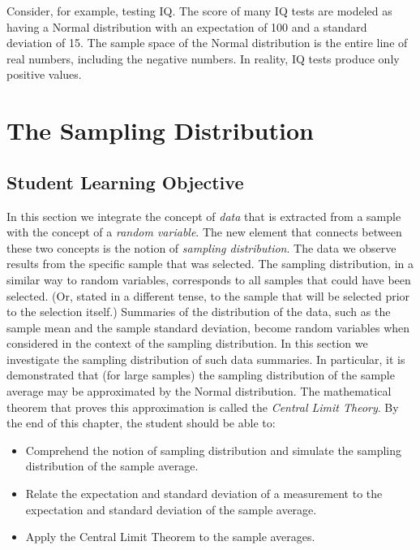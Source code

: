 \documentclass[]{krantz}
\theoremstyle{definition}
\theoremstyle{definition}
\theoremstyle{definition}
\theoremstyle{remark}
\begin{document}
Consider, for example, testing IQ. The score of many IQ tests are
modeled as having a Normal distribution with an expectation of 100 and a
standard deviation of 15. The sample space of the Normal distribution is
the entire line of real numbers, including the negative numbers. In
reality, IQ tests produce only positive values.

\chapter{The Sampling Distribution}\label{ChapSampDist}

\section{Student Learning Objective}\label{student-learning-objective-3}

In this section we integrate the concept of \emph{data} that is
extracted from a sample with the concept of a \emph{random variable}.
The new element that connects between these two concepts is the notion
of \emph{sampling distribution}. The data we observe results from the
specific sample that was selected. The sampling distribution, in a
similar way to random variables, corresponds to all samples that could
have been selected. (Or, stated in a different tense, to the sample that
will be selected prior to the selection itself.) Summaries of the
distribution of the data, such as the sample mean and the sample
standard deviation, become random variables when considered in the
context of the sampling distribution. In this section we investigate the
sampling distribution of such data summaries. In particular, it is
demonstrated that (for large samples) the sampling distribution of the
sample average may be approximated by the Normal distribution. The
mathematical theorem that proves this approximation is called the
\emph{Central Limit Theory}. By the end of this chapter, the student
should be able to:

\begin{itemize}
\item
  Comprehend the notion of sampling distribution and simulate the
  sampling distribution of the sample average.
\item
  Relate the expectation and standard deviation of a measurement to the
  expectation and standard deviation of the sample average.
\item
  Apply the Central Limit Theorem to the sample averages.
\end{itemize}
\end{document}
